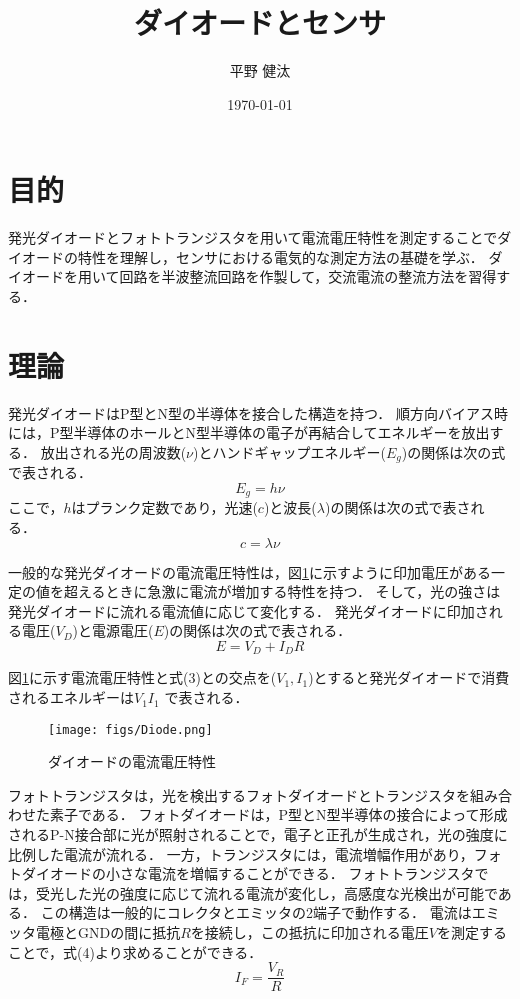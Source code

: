 \documentclass{ltjsarticle}
\begin{document}
\title{ダイオードとセンサ}
\author{平野 健汰}
\date{\today}

\maketitle

\section{目的}
発光ダイオードとフォトトランジスタを用いて電流電圧特性を測定することでダイオードの特性を理解し，センサにおける電気的な測定方法の基礎を学ぶ．
ダイオードを用いて回路を半波整流回路を作製して，交流電流の整流方法を習得する．

\section{理論}
発光ダイオードはP型とN型の半導体を接合した構造を持つ．
順方向バイアス時には，P型半導体のホールとN型半導体の電子が再結合してエネルギーを放出する．
放出される光の周波数(${\nu}$)とハンドギャップエネルギー(${E_g}$)の関係は次の式で表される．
\begin{equation}
  E_g = h \nu
\end{equation}
ここで，${h}$はプランク定数であり，光速(${c}$)と波長(${\lambda}$)の関係は次の式で表される．
\begin{equation}
  c = \lambda \nu
\end{equation}

一般的な発光ダイオードの電流電圧特性は，図\ref{fig:Diode}に示すように印加電圧がある一定の値を超えるときに急激に電流が増加する特性を持つ．
そして，光の強さは発光ダイオードに流れる電流値に応じて変化する．
発光ダイオードに印加される電圧(${V_D}$)と電源電圧(${E}$)の関係は次の式で表される．
\begin{equation}
  E = V_D + I_D R
\end{equation}

図\ref{fig:Diode}に示す電流電圧特性と式(3)との交点を(${V_1 , I_1}$)とすると発光ダイオードで消費されるエネルギーは${V_1 I_1}$ で表される．

\begin{figure}[H]
  \centering
  \texttt{[image: figs/Diode.png]}
  \caption{ダイオードの電流電圧特性}
  \label{fig:Diode}
\end{figure}

フォトトランジスタは，光を検出するフォトダイオードとトランジスタを組み合わせた素子である．
フォトダイオードは，P型とN型半導体の接合によって形成されるP-N接合部に光が照射されることで，電子と正孔が生成され，光の強度に比例した電流が流れる．
一方，トランジスタには，電流増幅作用があり，フォトダイオードの小さな電流を増幅することができる．
フォトトランジスタでは，受光した光の強度に応じて流れる電流が変化し，高感度な光検出が可能である．
この構造は一般的にコレクタとエミッタの2端子で動作する．
電流はエミッタ電極とGNDの間に抵抗${R}$を接続し，この抵抗に印加される電圧${V}$を測定することで，式(4)より求めることができる．
\begin{equation}
  I_F = \frac{V_R}{R}
\end{equation}
\end{document}
